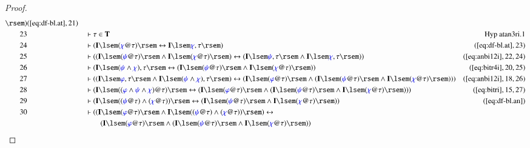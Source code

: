 \begin{proof}
\begin{align}
      \rsem )&(\mbox{\ref{eq:df-bl.at}},21)\notag
  \\ 23 &&  & \vdash \tau \in
      \mathbf{T}&\text{Hyp~atan3ri.1}\notag%
  \\ 24 &&  & \vdash ( \mathbf{I} \lsem ( \mw{\chi} @ \tau ) \rsem
      \leftrightarrow \mathbf{I} \lsem \mw{\chi} , \tau
      \rsem )&(\mbox{\ref{eq:df-bl.at}},23)\notag
  \\ 25 &&  & \vdash ( ( \mathbf{I} \lsem ( \mw{\psi} @ \tau ) \rsem \wedge
      \mathbf{I} \lsem ( \mw{\chi} @ \tau ) \rsem )
      \leftrightarrow ( \mathbf{I} \lsem \mw{\psi} , \tau
      \rsem \wedge \mathbf{I} \lsem \mw{\chi} , \tau \rsem
      ) )&(\mbox{\ref{eq:anbi12i}},22,24)\notag
  \\ 26 &&  & \vdash ( \mathbf{I} \lsem ( \mw{\psi} \wedge \mw{\chi} ) , \tau
      \rsem \leftrightarrow ( \mathbf{I} \lsem ( \mw{\psi}
      @ \tau ) \rsem \wedge \mathbf{I} \lsem ( \mw{\chi} @
      \tau ) \rsem ) )&(\mbox{\ref{eq:bitr4i}},20,25)\notag
  \\ 27 &&  & \vdash ( ( \mathbf{I} \lsem \mw{\varphi} , \tau \rsem \wedge
      \mathbf{I} \lsem ( \mw{\psi} \wedge \mw{\chi} ) ,
      \tau \rsem ) \leftrightarrow ( \mathbf{I} \lsem (
      \mw{\varphi} @ \tau ) \rsem \wedge ( \mathbf{I} \lsem
      ( \mw{\psi} @ \tau ) \rsem \wedge \mathbf{I} \lsem (
      \mw{\chi} @ \tau ) \rsem ) )
      )&(\mbox{\ref{eq:anbi12i}},18,26)\notag
  \\ 28 &&  & \vdash ( \mathbf{I} \lsem ( ( \mw{\varphi} \wedge \mw{\psi}
      \wedge \mw{\chi} ) @ \tau ) \rsem \leftrightarrow (
      \mathbf{I} \lsem ( \mw{\varphi} @ \tau ) \rsem \wedge
      ( \mathbf{I} \lsem ( \mw{\psi} @ \tau ) \rsem \wedge
      \mathbf{I} \lsem ( \mw{\chi} @ \tau ) \rsem ) )
      )&(\mbox{\ref{eq:bitri}},15,27)\notag
  \\ 29 &&  & \vdash ( \mathbf{I} \lsem ( ( \mw{\psi} @ \tau ) \wedge (
      \mw{\chi} @ \tau ) ) \rsem \leftrightarrow (
      \mathbf{I} \lsem ( \mw{\psi} @ \tau ) \rsem \wedge
      \mathbf{I} \lsem ( \mw{\chi} @ \tau ) \rsem )
      )&(\mbox{\ref{eq:df-bl.an}})\notag
  \\ 30 &&  & \vdash ( ( \mathbf{I} \lsem ( \mw{\varphi} @ \tau ) \rsem \wedge
      \mathbf{I} \lsem ( ( \mw{\psi} @ \tau ) \wedge (
      \mw{\chi} @ \tau ) ) \rsem ) \leftrightarrow  \notag \\ & & & \qquad
      (
      \mathbf{I} \lsem ( \mw{\varphi} @ \tau ) \rsem \wedge
      ( \mathbf{I} \lsem ( \mw{\psi} @ \tau ) \rsem \wedge
      \mathbf{I} \lsem ( \mw{\chi} @ \tau ) \rsem ) )

\end{align}
\end{proof}
